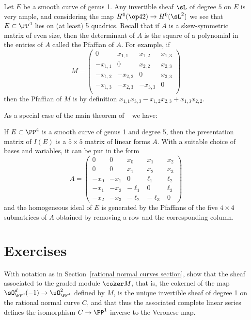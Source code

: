 \begin{fact}
Let $E$ be a smooth curve of genus 1. Any invertible sheaf $\sL$ of degree $5$ on $E$ is very ample, and considering the map $H^0(\op42) \to H^0(\sL^2)$
we see that $E\subset \PP^4$ lies on (at least) 5 quadrics. 
Recall that if $A$ is a skew-symmetric matrix of even size,
then the determinant of $A$ is the square of a polynomial in the entries of $A$ called the Pfaffian of $A$. For example, if
$$
M = \begin{pmatrix}
0&x_{1,1}&x_{1,2}&x_{1,3}\\
-x_{1,1}&0&x_{2,2}&x_{2,3}\\
-x_{1,2}&-x_{2,2}&0&x_{3,3}\\
-x_{1,3}&-x_{2,3}&-x_{3,3}&0\\
\end{pmatrix}
$$
then the Pfaffian of $M$ is by definition $x_{1,1}x_{3,3}-x_{1,2}x_{2,3}+x_{1,3}x_{2,2}$.

As a special case of the main theorem of ~\cite{MR453723} we have:
\begin{proposition} \cite[Theorem11]{Eisenbud1995}
If $E\subset \PP^4$ is a smooth curve of genus 1 and degree 5, then the presentation matrix of $I(E)$ is
a $5\times 5$ matrix of linear forms $A$. With a suitable choice of bases and variables, it can be put in the form
$$
A = 
\begin{pmatrix}
0&0&x_0&x_1&x_2\\
0&0&x_1&x_2&x_3\\
-x_0&-x_1&0&\ell_1&\ell_2\\
-x_1&-x_2&-\ell_1&0&\ell_3\\
-x_2&-x_3&-\ell_2&-\ell_3&0
\end{pmatrix}
$$
and
the homogeneous ideal of $E$ is generated by the  Pfaffians of the five $4\times 4$ submatrices of $A$ obtained by removing
a row and the corresponding column.
\end{proposition}
\end{fact}

\section{Exercises}

\begin{exercise}\label{veronese inverse}
With notation as in Section~\ref{rational normal curves section}, show that the sheaf associated to the graded module $\coker M$,
that is, the cokernel of the map $\sO_{\PP^d}^d(-1) \to \sO_{\PP^d}^2$ defined by $M$, is the unique invertible sheaf of degree 1
on the rational normal curve $C$, and that thus the associated complete linear series defines the isomorphism $C\to \PP^1$ inverse
to the Veronese map.
\end{exercise}

